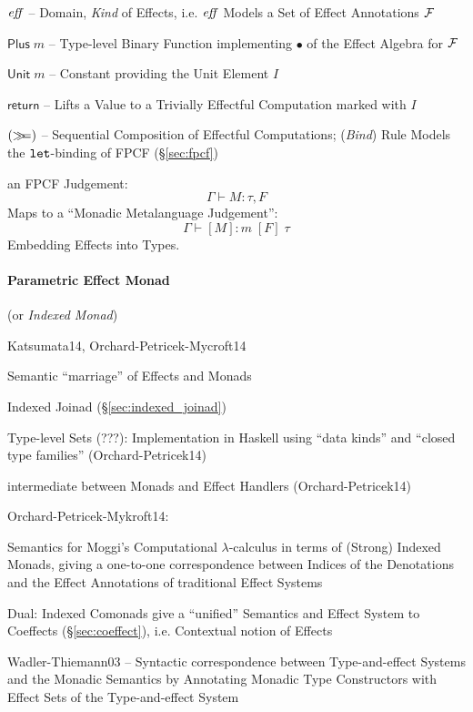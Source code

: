 $\text{\emph{eff}}$ -- Domain, \emph{Kind} of Effects, i.e. $\text{\emph{eff}}$ Models a Set of
Effect Annotations $\mathcal{F}$

$\mathsf{Plus}\;m$ -- Type-level Binary Function implementing $\bullet$
of the Effect Algebra for $\mathcal{F}$

$\mathsf{Unit}\;m$ -- Constant providing the Unit Element $I$

$\mathsf{return}$ -- Lifts a Value to a Trivially Effectful
Computation marked with $I$

$(\mathsf{\gg\kern-3pt=})$ -- Sequential Composition of Effectful Computations;
(\emph{Bind}) Rule Models the $\mathtt{let}$-binding of FPCF
(\S\ref{sec:fpcf})

an FPCF Judgement:
\[
  \Gamma \vdash M:\tau,F
\]
Maps to a ``Monadic Metalanguage Judgement'': %
\[
  \Gamma \vdash [M]:m\;[F]\;\tau
\]
Embedding Effects into Types. \cite{wadler-thiemann03}




\paragraph{Parametric Effect Monad}
\label{sec:parametric_effect_monad} \hfill

(or \emph{Indexed Monad})

Katsumata14, Orchard-Petricek-Mycroft14

Semantic ``marriage'' of Effects and Monads

Indexed Joinad (\S\ref{sec:indexed_joinad})

Type-level Sets (???): Implementation in Haskell using ``data kinds''
and ``closed type families'' (Orchard-Petricek14) %

intermediate between Monads and Effect Handlers (Orchard-Petricek14)


Orchard-Petricek-Mykroft14:

Semantics for Moggi's Computational $\lambda$-calculus in terms of
(Strong) Indexed Monads, giving a one-to-one correspondence between
Indices of the Denotations and the Effect Annotations of traditional
Effect Systems

Dual: Indexed Comonads give a ``unified'' Semantics and Effect System
to Coeffects (\S\ref{sec:coeffect}), i.e. Contextual notion of Effects

Wadler-Thiemann03 -- Syntactic correspondence between Type-and-effect
Systems and the Monadic Semantics by Annotating Monadic Type
Constructors with Effect Sets of the Type-and-effect System

